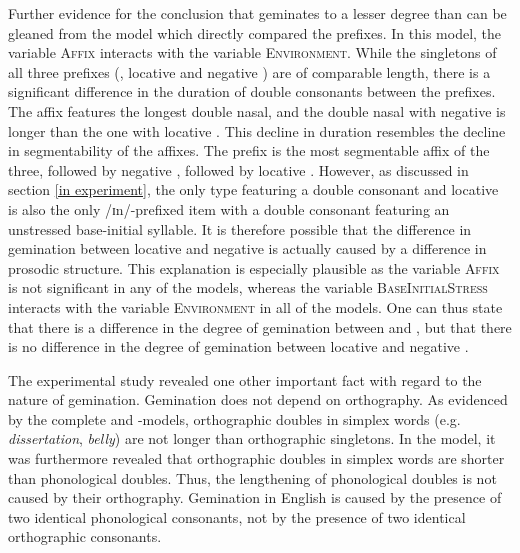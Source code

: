 Further evidence for the conclusion that  geminates to a lesser degree than  can be gleaned from the model which directly compared the prefixes. In this model, the variable \textsc{Affix} interacts with the variable \textsc{Environment}. 
While the singletons of all three prefixes (, locative  and negative ) are of comparable length, there is a significant difference in the duration of double consonants between the prefixes. The affix  features the longest double nasal,  and the double nasal with negative  is longer than the one with locative . This decline in duration resembles the decline in segmentability of the affixes. The prefix  is the most segmentable affix of the three, followed by negative , followed by locative . However, as discussed in section \ref{in experiment}, the only type featuring a double consonant and locative  is also the only /ɪn/-prefixed item with a double consonant featuring an unstressed base-initial syllable. It is therefore possible that the difference in gemination between locative and negative  is actually caused by a difference in prosodic structure. This explanation is especially plausible as the variable \textsc{Affix} is not significant in any of the models, whereas the variable \textsc{BaseInitialStress} interacts with the variable \textsc{Environment} in all of the models. 
One can thus state that there is a difference in the degree of gemination between  and , but that there is no difference in the degree of gemination between locative and negative .


The experimental study revealed one other important fact with regard to the nature of gemination. Gemination does not depend on orthography. As evidenced by the complete  and -models, orthographic doubles in simplex words (e.g. \textit{dissertation}, \textit{belly}) are not longer than orthographic singletons. 
In the model, it was furthermore revealed that orthographic doubles in simplex words are shorter than phonological doubles. 
Thus, the lengthening of phonological doubles is not caused by their orthography. %
Gemination in English is caused by the presence of two identical phonological consonants, not by the presence of two identical orthographic consonants.

